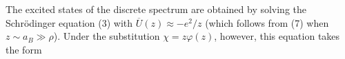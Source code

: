 The excited states of the discrete spectrum are obtained by solving the Schr\"odinger equation (3) with $\overline U(z)\approx-e^2/z$ (which follows from (7) when $z\sim a_B\gg\rho$). Under the substitution $\chi=z\varphi(z)$, however, this equation takes the form

